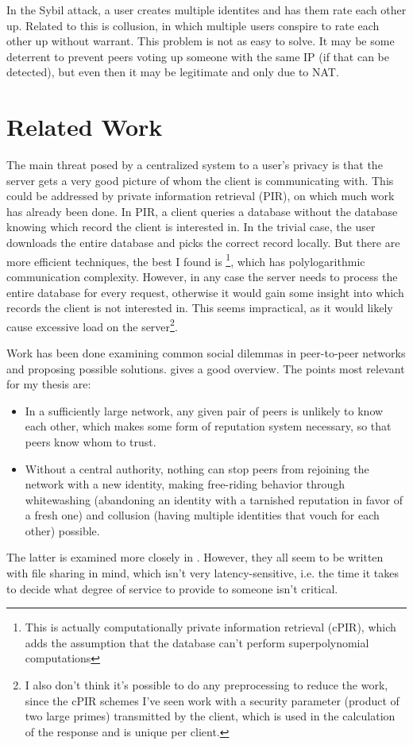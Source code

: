 \documentclass[10pt]{article}
\begin{document}
In the Sybil attack, a user creates multiple identites and has them rate each
other up. Related to this is collusion, in which multiple users conspire to rate
each other up without warrant. This problem is not as easy to solve. It may be
some deterrent to prevent peers voting up someone with the same IP (if that can
be detected), but even then it may be legitimate and only due to NAT.

\section*{Related Work}
The main threat posed by a centralized system to a user's privacy is that the
server gets a very good picture of whom the client is communicating with. This
could be addressed by private information retrieval (PIR), on which much work
has already been done. In PIR, a client queries a database without the database
knowing which record the client is interested in. In the trivial case, the user
downloads the entire database and picks the correct record locally. But there
are more efficient techniques, the best I found is
\cite{cachin1999computationally}\footnote{This is actually computationally
private information retrieval (cPIR), which adds the assumption that the
database can't perform superpolynomial computations}, which has polylogarithmic
communication complexity. However, in any case the server needs to process the
entire database for every request, otherwise it would gain some insight into
which records the client is not interested in. This seems impractical, as it
would likely cause excessive load on the server\footnote{I also don't think it's
possible to do any preprocessing to reduce the work, since the cPIR schemes I've
seen work with a security parameter (product of two large primes) transmitted by
the client, which is used in the calculation of the response and is unique per
client.}.

Work has been done examining common social dilemmas in peer-to-peer networks and
proposing possible solutions. \cite{feldman2004robust} gives a good overview.
The points most relevant for my thesis are:
\begin{itemize}
\item In a sufficiently large network, any given pair of peers is unlikely to
know each other, which makes some form of reputation system necessary, so that
peers know whom to trust.
\item Without a central authority, nothing can stop peers from rejoining the
network with a new identity, making free-riding behavior through whitewashing
(abandoning an identity with a tarnished reputation in favor of a fresh one) and
collusion (having multiple identities that vouch for each other) possible.
\end{itemize}
The latter is examined more closely in
\cite{feldman2006free,friedman2001social,douceur2002sybil}.
However, they all seem to be written with file sharing in mind, which isn't very
latency-sensitive, i.e. the time it takes to decide what degree of service to
provide to someone isn't critical.
\end{document}

